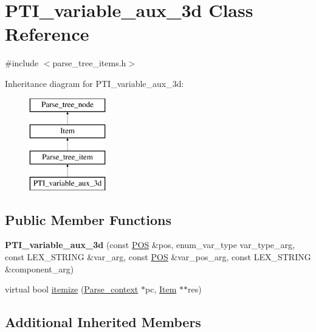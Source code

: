 \hypertarget{classPTI__variable__aux__3d}{}\section{P\+T\+I\+\_\+variable\+\_\+aux\+\_\+3d Class Reference}
\label{classPTI__variable__aux__3d}


{\ttfamily \#include $<$parse\+\_\+tree\+\_\+items.\+h$>$}

Inheritance diagram for P\+T\+I\+\_\+variable\+\_\+aux\+\_\+3d\+:\begin{figure}[H]
\begin{center}
\leavevmode
\includegraphics[height=4.000000cm]{classPTI__variable__aux__3d}
\end{center}
\end{figure}
\subsection*{Public Member Functions}
\begin{DoxyCompactItemize}
\item 
\mbox{\label{classPTI__variable__aux__3d_ae3907ac0006260efc39f2ec42c644858}} 
{\bfseries P\+T\+I\+\_\+variable\+\_\+aux\+\_\+3d} (const \mbox{\hyperlink{structYYLTYPE}{P\+OS}} \&pos, enum\+\_\+var\+\_\+type var\+\_\+type\+\_\+arg, const L\+E\+X\+\_\+\+S\+T\+R\+I\+NG \&var\+\_\+arg, const \mbox{\hyperlink{structYYLTYPE}{P\+OS}} \&var\+\_\+pos\+\_\+arg, const L\+E\+X\+\_\+\+S\+T\+R\+I\+NG \&component\+\_\+arg)
\item 
virtual bool \mbox{\hyperlink{classPTI__variable__aux__3d_a0a705f4286ede797ca2760987f572a84}{itemize}} (\mbox{\hyperlink{structParse__context}{Parse\+\_\+context}} $\ast$pc, \mbox{\hyperlink{classItem}{Item}} $\ast$$\ast$res)
\end{DoxyCompactItemize}
\subsection*{Additional Inherited Members}


